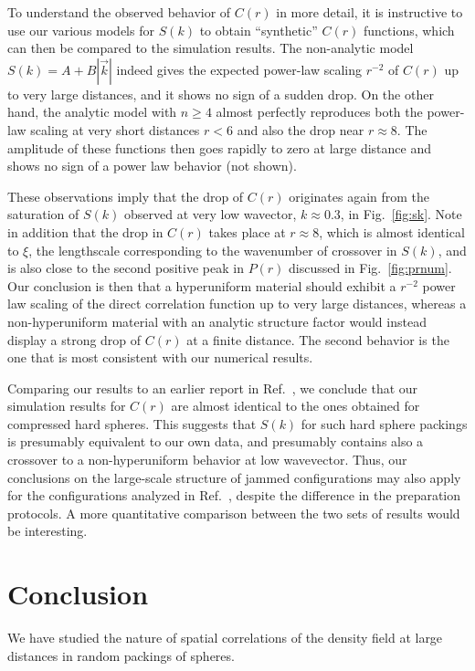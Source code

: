 \documentclass[aps,pre,twocolumn,superscriptaddress]{revtex4-1}
\begin{document}
To understand the observed behavior of $C(r)$ in more 
detail, it is instructive to use our various models for 
$S(k)$ to obtain ``synthetic'' $C(r)$ functions, which can then be compared to 
the simulation results. 
The non-analytic model $S(k) = A + B|\vec{k}|$ indeed gives 
the expected power-law scaling $r^{-2}$ of $C(r)$ 
up to very large distances, and it shows no sign of a sudden drop.
On the other hand, the analytic model with $n\geq 4$ 
almost perfectly reproduces both the power-law scaling at very short distances
$r < 6$ and also the drop near $r \approx 8$. The amplitude
of these functions then goes rapidly to zero at large distance 
and shows no sign of a power law behavior (not shown).
 
These observations imply that the drop of $C(r)$ 
originates again from the saturation of $S(k)$ observed at very low 
wavector, $k \approx 0.3$, in Fig.~\ref{fig:sk}. 
Note in addition that the drop in $C(r)$ takes place at $r \approx 8$, 
which is almost identical to $\xi$, 
the lengthscale corresponding to the wavenumber of crossover in $S(k)$, 
and is also close to the second positive peak in $P(r)$ 
discussed in Fig.~\ref{fig:prnum}.
Our conclusion is then that a hyperuniform material should 
exhibit a $r^{-2}$ power law scaling of the direct correlation 
function up to very large distances, whereas a non-hyperuniform material
with an analytic structure factor would instead display a strong 
drop of $C(r)$ at a finite distance. The second 
behavior is the one that is most consistent with our numerical results. 

Comparing our results to an earlier report in Ref.~\cite{atkinson2016}, 
we conclude that our simulation results for $C(r)$ are 
almost identical to the ones obtained for compressed hard spheres. 
This suggests that $S(k)$ for such hard sphere packings is 
presumably equivalent to our own data, and presumably contains also  
a crossover to a non-hyperuniform behavior at low wavevector.
Thus, our conclusions on the large-scale structure of jammed configurations 
may also apply for the configurations analyzed in Ref.~\cite{atkinson2016}, 
despite the difference in the preparation protocols. A more 
quantitative comparison between the two sets of results would be interesting.

\section{Conclusion}
\label{sec:conclusion}

We have studied the nature of spatial correlations
of the density field at large distances in random packings of spheres. 
\end{document}
